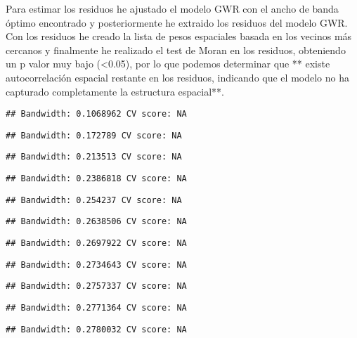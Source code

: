 \documentclass[
]{article}
\begin{document}
Para estimar los residuos he ajustado el modelo GWR con el ancho de
banda óptimo encontrado y posteriormente he extraido los residuos del
modelo GWR. Con los residuos he creado la lista de pesos espaciales
basada en los vecinos más cercanos y finalmente he realizado el test de
Moran en los residuos, obteniendo un p valor muy bajo (\textless0.05),
por lo que podemos determinar que ** existe autocorrelación espacial
restante en los residuos, indicando que el modelo no ha capturado
completamente la estructura espacial**.

\begin{verbatim}
## Bandwidth: 0.1068962 CV score: NA
\end{verbatim}

\begin{verbatim}
## Bandwidth: 0.172789 CV score: NA
\end{verbatim}

\begin{verbatim}
## Bandwidth: 0.213513 CV score: NA
\end{verbatim}

\begin{verbatim}
## Bandwidth: 0.2386818 CV score: NA
\end{verbatim}

\begin{verbatim}
## Bandwidth: 0.254237 CV score: NA
\end{verbatim}

\begin{verbatim}
## Bandwidth: 0.2638506 CV score: NA
\end{verbatim}

\begin{verbatim}
## Bandwidth: 0.2697922 CV score: NA
\end{verbatim}

\begin{verbatim}
## Bandwidth: 0.2734643 CV score: NA
\end{verbatim}

\begin{verbatim}
## Bandwidth: 0.2757337 CV score: NA
\end{verbatim}

\begin{verbatim}
## Bandwidth: 0.2771364 CV score: NA
\end{verbatim}

\begin{verbatim}
## Bandwidth: 0.2780032 CV score: NA
\end{verbatim}
\end{document}
